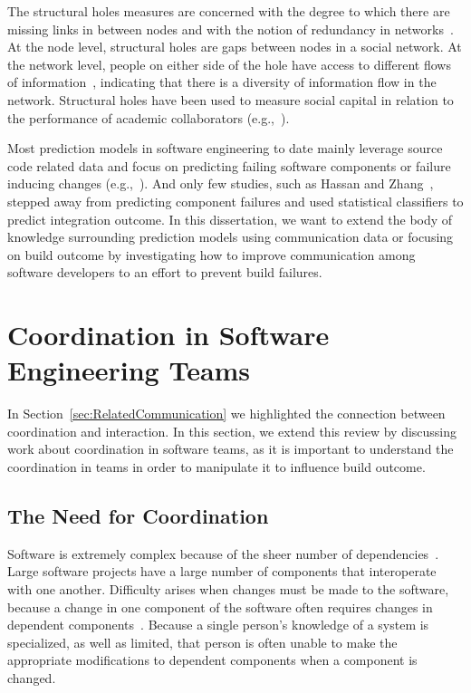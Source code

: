 The structural holes measures are concerned with the degree to which there
are missing links in between nodes and with the notion of redundancy in
networks~\cite{Burt:1995vo}. At the node level, structural holes are gaps between
nodes in a social network. At the network level, people on either side of the
hole have access to different flows of information~\cite{Hargadon:1997asq},
indicating that there is a diversity of information flow in the network.
Structural holes have been used to measure social capital in relation to the
performance of academic collaborators (e.g.,~\cite{Brambila:PICMET2007}).

Most prediction models in software engineering to date mainly leverage source
code related data and focus on predicting failing software components or failure
inducing changes
(e.g.,~\cite{bell:2005tse,schroeter:isese:2006,zimmermann:icse:2008,kim:2008tse}).
And only few studies, such as Hassan and Zhang~\cite{hassan:ase:2006}, stepped away
from predicting component failures and used statistical classifiers to predict
integration outcome.
In this dissertation, we want to extend the body of knowledge surrounding prediction models using communication data or focusing on build outcome by investigating how to improve communication among software developers to an effort to prevent build failures.



\section{Coordination in Software Engineering Teams}
In Section~\ref{sec:RelatedCommunication} we highlighted the connection between coordination and interaction.
In this section, we extend this review by discussing work about coordination in software teams, as it is important to understand the coordination in teams in order to manipulate it to influence build outcome.

\subsection{The Need for Coordination}
Software is extremely complex because of the sheer number of dependencies~\cite{sawyer2004:teams}.
Large software projects have a large number of components that interoperate with one another.
Difficulty arises when changes must be made to the software, because a change in one component of the software often requires changes in dependent components~\cite{desouza:2008}. Because a single person's knowledge of a system is specialized, as well as limited, that person is often unable to make the appropriate modifications to dependent components when a component is changed.


